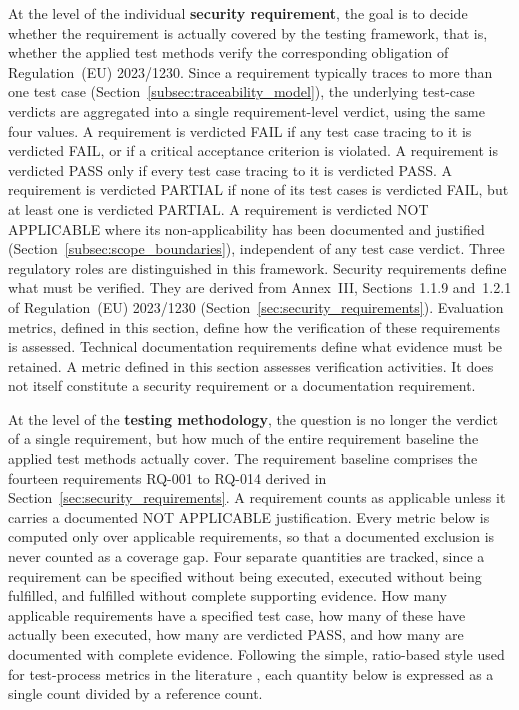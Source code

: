 At the level of the individual \textbf{security requirement}, the goal is to decide whether the requirement is actually covered by the testing framework, that is, whether the applied test methods verify the corresponding obligation of Regulation~(EU) 2023/1230. Since a requirement typically traces to more than one test case (Section~\ref{subsec:traceability_model}), the underlying test-case verdicts are aggregated into a single requirement-level verdict, using the same four values. A requirement is verdicted FAIL if any test case tracing to it is verdicted FAIL, or if a critical acceptance criterion is violated. A requirement is verdicted PASS only if every test case tracing to it is verdicted PASS. A requirement is verdicted PARTIAL if none of its test cases is verdicted FAIL, but at least one is verdicted PARTIAL. A requirement is verdicted NOT APPLICABLE where its non-applicability has been documented and justified (Section~\ref{subsec:scope_boundaries}), independent of any test case verdict.
Three regulatory roles are distinguished in this framework. Security requirements define what must be verified. They are derived from Annex~III, Sections~1.1.9 and~1.2.1 of Regulation~(EU) 2023/1230 (Section~\ref{sec:security_requirements}). Evaluation metrics, defined in this section, define how the verification of these requirements is assessed. Technical documentation requirements define what evidence must be retained. A metric defined in this section assesses verification activities. It does not itself constitute a security requirement or a documentation requirement.

At the level of the \textbf{testing methodology}, the question is no longer the verdict of a single requirement, but how much of the entire requirement baseline the applied test methods actually cover. The requirement baseline comprises the fourteen requirements RQ-001 to RQ-014 derived in Section~\ref{sec:security_requirements}. A requirement counts as applicable unless it carries a documented NOT APPLICABLE justification. 
Every metric below is computed only over applicable requirements, so that a documented exclusion is never counted as a coverage gap. Four separate quantities are tracked, since a requirement can be specified without being executed, executed without being fulfilled, and fulfilled without complete supporting evidence. How many applicable requirements have a specified test case, how many of these have actually been executed, how many are verdicted PASS, and how many are documented with complete evidence. Following the simple, ratio-based style used for test-process metrics in the literature \cite[pp. 145]{Witte2019}, each quantity below is expressed as a single count divided by a reference count.

